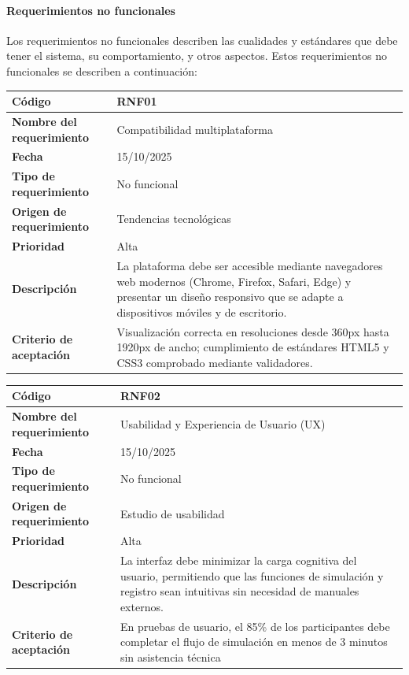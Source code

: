 {}
\paragraph*{Requerimientos no funcionales}

Los requerimientos no funcionales describen las cualidades y estándares que debe tener el sistema, su comportamiento, y otros aspectos. Estos requerimientos no funcionales se describen a continuación:

\begin{table}[H]
	\begin{tabular}{|s{5cm}|m{11cm}|}
		\hline
		\textbf{Código} & RNF01 \\ \hline
		\textbf{Nombre del requerimiento} & Compatibilidad multiplataforma \\ \hline
		\textbf{Fecha} & 15/10/2025 \\ \hline
		\textbf{Tipo de requerimiento} & No funcional \\ \hline
		\textbf{Origen de requerimiento} & Tendencias tecnológicas \\ \hline
		\textbf{Prioridad} & Alta \\ \hline
		\textbf{Descripción} & La plataforma debe ser accesible mediante navegadores web modernos (Chrome, Firefox, Safari, Edge) y presentar un diseño responsivo que se adapte a dispositivos móviles y de escritorio. \\ \hline
		\textbf{Criterio de aceptación} & Visualización correcta en resoluciones desde 360px hasta 1920px de ancho; cumplimiento de estándares HTML5 y CSS3 comprobado mediante validadores. \\ \hline
	\end{tabular}
\end{table}

\begin{table}[H]
	\begin{tabular}{|s{5cm}|m{11cm}|}
		\hline
		\textbf{Código} & RNF02 \\ \hline
		\textbf{Nombre del requerimiento} & Usabilidad y Experiencia de Usuario (UX) \\ \hline
		\textbf{Fecha} & 15/10/2025 \\ \hline
		\textbf{Tipo de requerimiento} & No funcional \\ \hline
		\textbf{Origen de requerimiento} & Estudio de usabilidad \\ \hline
		\textbf{Prioridad} & Alta \\ \hline
		\textbf{Descripción} & La interfaz debe minimizar la carga cognitiva del usuario, permitiendo que las funciones de simulación y registro sean intuitivas sin necesidad de manuales externos. \\ \hline
		\textbf{Criterio de aceptación} & En pruebas de usuario, el 85\% de los participantes debe completar el flujo de simulación en menos de 3 minutos sin asistencia técnica \\ \hline
	\end{tabular}
\end{table}

